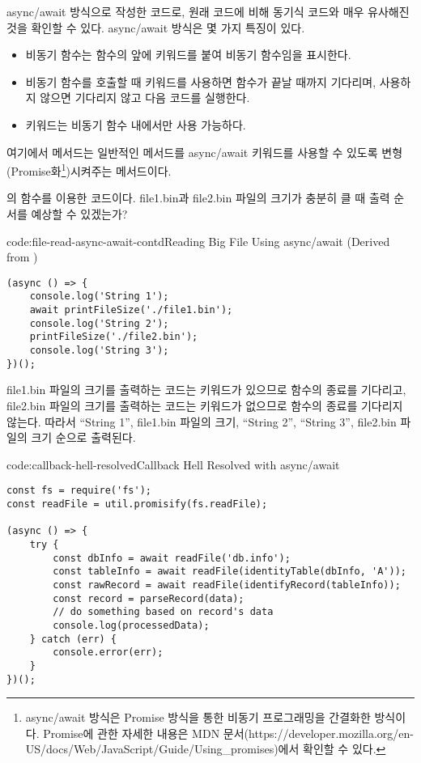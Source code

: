 \은 \를 async/await 방식으로 작성한 코드로, 원래 코드에 비해 동기식 코드와 매우 유사해진 것을 확인할 수 있다. async/await 방식은 몇 가지 특징이 있다.

\begin{itemize}
    \item 비동기 함수는 함수의 앞에  키워드를 붙여 비동기 함수임을 표시한다.
    \item 비동기 함수를 호출할 때  키워드를 사용하면 함수가 끝날 때까지 기다리며, 사용하지 않으면 기다리지 않고 다음 코드를 실행한다.
    \item {} 키워드는 비동기 함수 내에서만 사용 가능하다.
\end{itemize}

여기에서  메서드는 일반적인 메서드를 async/await 키워드를 사용할 수 있도록 변형(Promise화\footnote{async/await 방식은 Promise 방식을 통한 비동기 프로그래밍을 간결화한 방식이다. Promise에 관한 자세한 내용은 MDN 문서(https://developer.mozilla.org/en-US/docs/Web/JavaScript/Guide/Using\_promises)에서 확인할 수 있다.})시켜주는 메서드이다.

\는 의  함수를 이용한 코드이다. file1.bin과 file2.bin 파일의 크기가 충분히 클 때 출력 순서를 예상할 수 있겠는가?

\begin{codeenv}{code:file-read-async-await-contd}{Reading Big File Using async/await (Derived from )}\begin{verbatim}
(async () => {
    console.log('String 1');
    await printFileSize('./file1.bin');
    console.log('String 2');
    printFileSize('./file2.bin');
    console.log('String 3');
})();
\end{verbatim}
\end{codeenv}

file1.bin 파일의 크기를 출력하는 코드는  키워드가 있으므로  함수의 종료를 기다리고, file2.bin 파일의 크기를 출력하는 코드는  키워드가 없으므로 함수의 종료를 기다리지 않는다. 따라서 ``String 1'', file1.bin 파일의 크기, ``String 2'', ``String 3'', file2.bin 파일의 크기 순으로 출력된다.

\begin{codeenv}{code:callback-hell-resolved}{Callback Hell Resolved with async/await}\begin{verbatim}
const fs = require('fs');
const readFile = util.promisify(fs.readFile);

(async () => {
    try {
        const dbInfo = await readFile('db.info');
        const tableInfo = await readFile(identityTable(dbInfo, 'A'));
        const rawRecord = await readFile(identifyRecord(tableInfo));
        const record = parseRecord(data);
        // do something based on record's data
        console.log(processedData);
    } catch (err) {
        console.error(err);
    }
})();
\end{verbatim}
\end{codeenv}

